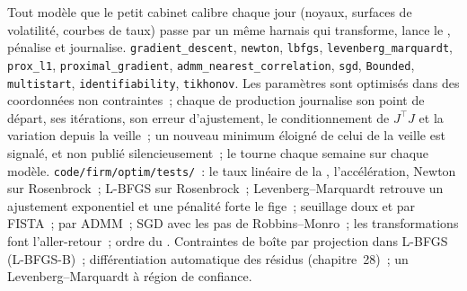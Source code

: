\begin{build}
 Tout modèle que le petit cabinet calibre chaque jour (noyaux, surfaces de volatilité, courbes de taux) passe par un même harnais qui transforme, lance le , pénalise et journalise.
 \texttt{gradient\_descent}, \texttt{newton}, \texttt{lbfgs}, \texttt{levenberg\_marquardt}, \texttt{prox\_l1}, \texttt{proximal\_gradient}, \texttt{admm\_nearest\_correlation},
\texttt{sgd}, \texttt{Bounded}, \texttt{multistart}, \texttt{identifiability}, \texttt{tikhonov}.
 Les paramètres sont optimisés dans des coordonnées non contraintes~; chaque  de production journalise son point de départ, ses itérations, son erreur d'ajustement, le conditionnement de $J^\top J$ et la variation depuis
la veille~; un nouveau minimum éloigné de celui de la veille est signalé, et non publié silencieusement~; le  tourne chaque semaine sur chaque modèle.
 \texttt{code/firm/optim/tests/}~: le taux linéaire de la , l'accélération, Newton sur Rosenbrock~; L-BFGS sur Rosenbrock~; Levenberg--Marquardt retrouve un ajustement exponentiel
et une pénalité forte le fige~; seuillage doux et  par FISTA~;  par ADMM~; SGD avec les pas de Robbins--Monro~; les transformations font l'aller-retour~; ordre du .
 Contraintes de boîte par projection dans L-BFGS (L-BFGS-B)~; différentiation automatique des résidus (chapitre~28)~; un Levenberg--Marquardt à région de confiance.
\end{build}

